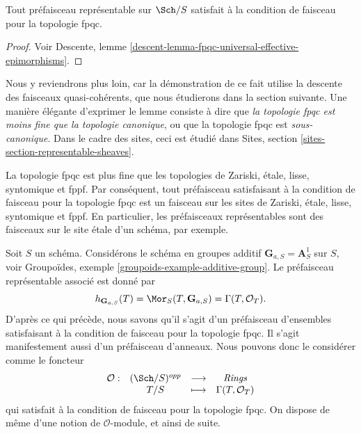 \begin{lemma}
\label{lemma-representable-sheaf-fpqc}
Tout pr\'efaisceau repr\'esentable sur $\Sch/S$ satisfait \`a la
condition de faisceau pour la topologie fpqc.
\end{lemma}

\begin{proof}
Voir
Descente, lemme \ref{descent-lemma-fpqc-universal-effective-epimorphisms}.
\end{proof}

\noindent
Nous y reviendrons plus loin, car la d\'emonstration de ce fait utilise
la descente des faisceaux quasi-coh\'erents, que nous \'etudierons dans la
section suivante. Une mani\`ere \'el\'egante d'exprimer le lemme consiste \`a dire que
{\it la topologie fpqc est moins fine que la topologie canonique}, ou
que la topologie fpqc est {\it sous-canonique}. Dans le cadre des sites,
ceci est \'etudi\'e dans
Sites, section \ref{sites-section-representable-sheaves}.

\begin{remark}
\label{remark-fpqc-finest}
La topologie fpqc est plus fine que les topologies de Zariski, \'etale,
lisse, syntomique et fppf. Par cons\'equent, tout pr\'efaisceau
satisfaisant \`a la condition de faisceau pour la topologie fpqc est un
faisceau sur les sites de Zariski, \'etale, lisse, syntomique et fppf.
En particulier, les pr\'efaisceaux repr\'esentables sont des faisceaux sur
le site \'etale d'un sch\'ema,
par exemple.
\end{remark}

\begin{example}
\label{example-additive-group-sheaf}
Soit $S$ un sch\'ema.
Consid\'erons le sch\'ema en groupes additif $\mathbf{G}_{a, S} = \mathbf{A}^1_S$
sur $S$, voir
Groupo\"ides, exemple \ref{groupoids-example-additive-group}.
Le pr\'efaisceau repr\'esentable associ\'e est donn\'e par
$$
h_{\mathbf{G}_{a, S}}(T) =
\Mor_S(T, \mathbf{G}_{a, S}) =
\Gamma(T, \mathcal{O}_T).
$$
D'apr\`es ce qui pr\'ec\`ede, nous savons qu'il s'agit d'un pr\'efaisceau
d'ensembles satisfaisant \`a la condition de faisceau pour la topologie fpqc. Il s'agit manifestement
aussi d'un pr\'efaisceau d'anneaux. Nous pouvons donc le consid\'erer comme le foncteur
$$
\begin{matrix}
\mathcal{O} : &
(\Sch/S)^{opp} &
\longrightarrow &
\textit{Rings} \\
&
T/S &
\longmapsto &
\Gamma(T, \mathcal{O}_T)
\end{matrix}
$$
qui satisfait \`a la condition de faisceau pour la topologie fpqc.
On dispose de m\^eme d'une notion de $\mathcal{O}$-module, et ainsi de
suite.
\end{example}




